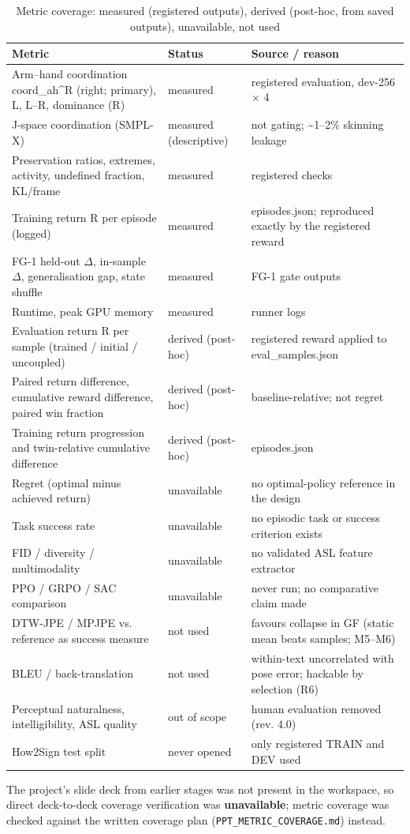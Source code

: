 \documentclass[conference]{IEEEtran}
\begin{document}
\begin{table}[t]\centering\caption{Metric coverage: measured (registered outputs), derived (post-hoc, from saved outputs), unavailable, not used}\footnotesize\begin{tabular}{lll}\toprule \textbf{Metric} & \textbf{Status} & \textbf{Source / reason} \\ \midrule Arm--hand coordination coord\_ah\textasciicircum{}R (right; primary), L, L--R, dominance (R) & measured & registered evaluation, dev-256 $\times$ 4 \\ J-space coordination (SMPL-X) & measured (descriptive) & not gating; \textasciitilde{}1--2\% skinning leakage \\ Preservation ratios, extremes, activity, undefined fraction, KL/frame & measured & registered checks \\ Training return R per episode (logged) & measured & episodes.json; reproduced exactly by the registered reward \\ FG-1 held-out $\Delta$, in-sample $\Delta$, generalisation gap, state shuffle & measured & FG-1 gate outputs \\ Runtime, peak GPU memory & measured & runner logs \\ Evaluation return R per sample (trained / initial / uncoupled) & derived (post-hoc) & registered reward applied to eval\_samples.json \\ Paired return difference, cumulative reward difference, paired win fraction & derived (post-hoc) & baseline-relative; not regret \\ Training return progression and twin-relative cumulative difference & derived (post-hoc) & episodes.json \\ Regret (optimal minus achieved return) & unavailable & no optimal-policy reference in the design \\ Task success rate & unavailable & no episodic task or success criterion exists \\ FID / diversity / multimodality & unavailable & no validated ASL feature extractor \\ PPO / GRPO / SAC comparison & unavailable & never run; no comparative claim made \\ DTW-JPE / MPJPE vs. reference as success measure & not used & favours collapse in GF (static mean beats samples; M5--M6) \\ BLEU / back-translation & not used & within-text uncorrelated with pose error; hackable by selection (R6) \\ Perceptual naturalness, intelligibility, ASL quality & out of scope & human evaluation removed (rev. 4.0) \\ How2Sign test split & never opened & only registered TRAIN and DEV used \\ \bottomrule\end{tabular}\end{table}
The project's slide deck from earlier stages was not present in the workspace, so direct deck-to-deck coverage verification was \textbf{unavailable}; metric coverage was checked against the written coverage plan (\texttt{PPT\_METRIC\_COVERAGE.md}) instead.
\end{document}
